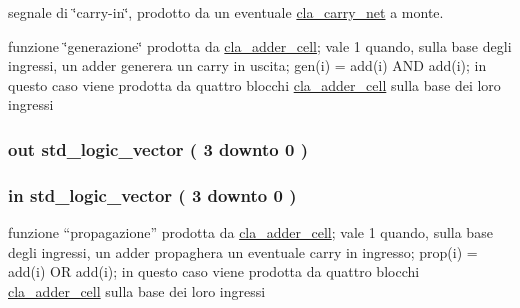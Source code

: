 segnale di \char`\"{}carry-\/in\char`\"{}, prodotto da un eventuale \hyperlink{classcla__carry__net}{cla\+\_\+carry\+\_\+net} a monte. 

funzione \char`\"{}generazione\char`\"{} prodotta da \hyperlink{classcla__adder__cell}{cla\+\_\+adder\+\_\+cell}; vale 1 quando, sulla base degli ingressi, un adder generera\textquotesingle{} un carry in uscita; gen(i) = add(i) A\+ND add(i); in questo caso viene prodotta da quattro blocchi \hyperlink{classcla__adder__cell}{cla\+\_\+adder\+\_\+cell} sulla base dei loro ingressi 
\subsubsection[{\texorpdfstring{carryout}{carryout}}]{ {\bfseries \textcolor{vhdlchar}{out}\textcolor{vhdlchar}{ }} {\bfseries \textcolor{vhdlchar}{std\+\_\+logic\+\_\+vector}\textcolor{vhdlchar}{ }\textcolor{vhdlchar}{(}\textcolor{vhdlchar}{ }\textcolor{vhdlchar}{ } \textcolor{vhdldigit}{3} \textcolor{vhdlchar}{ }\textcolor{vhdlchar}{downto}\textcolor{vhdlchar}{ }\textcolor{vhdlchar}{ } \textcolor{vhdldigit}{0} \textcolor{vhdlchar}{ }\textcolor{vhdlchar}{)}\textcolor{vhdlchar}{ }} \hspace{0.3cm}{\ttfamily [Port]}}\hypertarget{group___carry_network_ga6b265f3fe41195485dfedd9824c3598f}{}\label{group___carry_network_ga6b265f3fe41195485dfedd9824c3598f}
\subsubsection[{\texorpdfstring{gen}{gen}}]{ {\bfseries \textcolor{vhdlchar}{in}\textcolor{vhdlchar}{ }} {\bfseries \textcolor{vhdlchar}{std\+\_\+logic\+\_\+vector}\textcolor{vhdlchar}{ }\textcolor{vhdlchar}{(}\textcolor{vhdlchar}{ }\textcolor{vhdlchar}{ } \textcolor{vhdldigit}{3} \textcolor{vhdlchar}{ }\textcolor{vhdlchar}{downto}\textcolor{vhdlchar}{ }\textcolor{vhdlchar}{ } \textcolor{vhdldigit}{0} \textcolor{vhdlchar}{ }\textcolor{vhdlchar}{)}\textcolor{vhdlchar}{ }} \hspace{0.3cm}{\ttfamily [Port]}}\hypertarget{group___carry_network_ga1ff97daaf4e03defc21748593cacfaa7}{}\label{group___carry_network_ga1ff97daaf4e03defc21748593cacfaa7}
funzione “propagazione” prodotta da \hyperlink{classcla__adder__cell}{cla\+\_\+adder\+\_\+cell}; vale 1 quando, sulla base degli ingressi, un adder propaghera\textquotesingle{} un eventuale carry in ingresso; prop(i) = add(i) OR add(i); in questo caso viene prodotta da quattro blocchi \hyperlink{classcla__adder__cell}{cla\+\_\+adder\+\_\+cell} sulla base dei loro ingressi 
